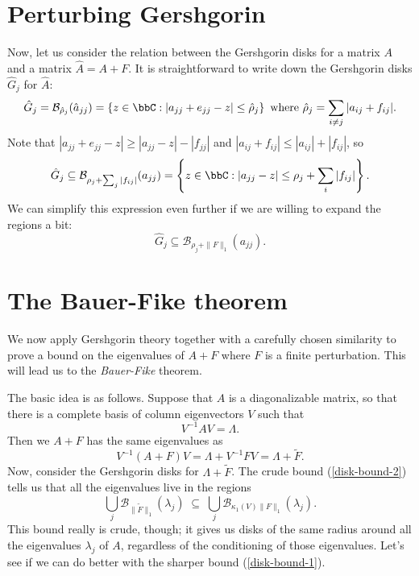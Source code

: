 \documentclass[12pt, leqno]{article} %
\newcommand{\calB}{\mathcal{B}}
\begin{document}
\section{Perturbing Gershgorin}

Now, let us consider the relation between the Gershgorin disks for
a matrix $A$ and a matrix $\hat{A} = A+F$.  It is straightforward to write
down the Gershgorin disks $\hat{G}_j$ for $\hat{A}$:
\[
  \hat{G}_j = \calB_{\hat{\rho}_j}(\hat{a}_{jj}) =
  \left\{
    z \in \bbC : |a_{jj}+e_{jj}-z| \leq \hat{\rho}_j
  \right\}
    \mbox{ where }
    \hat{\rho}_j = \sum_{i \neq j} |a_{ij}+f_{ij}|.
\]
Note that $|a_{jj} + e_{jj} - z| \geq |a_{jj}-z|-|f_{jj}|$
and $|a_{ij}+f_{ij}| \leq |a_{ij}|+|f_{ij}|$, so
\begin{equation} \label{disk-bound-1}
  \hat{G}_j \subseteq \calB_{\rho_j + \sum_j |f_{ij}|}(a_{jj}) =
  \left\{
    z \in \bbC : |a_{jj}-z| \leq \rho_j + \sum_i |f_{ij}|
  \right\}.
\end{equation}
We can simplify this expression even further if we are willing
to expand the regions a bit:
\begin{equation} \label{disk-bound-2}
  \hat{G}_j \subseteq \calB_{\rho_j + \|F\|_{1}}(a_{jj}).
\end{equation}

\section{The Bauer-Fike theorem}

We now apply Gershgorin theory together with a carefully chosen
similarity to prove a bound on the eigenvalues of $A+F$ where $F$ is a
finite perturbation.  This will lead us to the {\em Bauer-Fike} theorem.

The basic idea is as follows.  Suppose that $A$ is a diagonalizable matrix, so
that there is a complete basis of column eigenvectors $V$ such that
\[
  V^{-1} A V = \Lambda.
\]
Then we $A+F$ has the same eigenvalues as
\[
  V^{-1} (A+F) V = \Lambda + V^{-1} F V = \Lambda + \tilde{F}.
\]
Now, consider the Gershgorin disks for $\Lambda + \tilde{F}$.
The crude bound (\ref{disk-bound-2}) tells us
that all the eigenvalues live in the regions
\[
  \bigcup_j \calB_{\|\tilde{F}\|_1}(\lambda_j) \; \subseteq \;
  \bigcup_j \calB_{\kappa_1(V) \|F\|_1}(\lambda_j).
\]
This bound really is crude, though; it gives us disks of the
same radius around all the eigenvalues $\lambda_j$ of $A$,
regardless of the conditioning of those eigenvalues.  Let's
see if we can do better with the sharper bound (\ref{disk-bound-1}).
\end{document}
